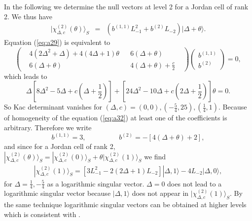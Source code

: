 \documentclass[a4paper,11pt]{article}
\begin{document}
In the following we determine the null vectors at level 2 for a
Jordan cell of rank 2. We thus have
\begin{eqnarray}\label{eq:a31}
|\chi_{\Delta,c}^{(2)}(\theta)\rangle_{S}&=&\left(b^{(1,1)}L_{-1}^{2}+b^{(2)}L_{-2}\right)|\Delta+\theta\rangle.
\end{eqnarray}
Equation (\ref{eq:a29}) is equivalent to
\begin{equation}\label{eq:a32}
\left(\begin{array}{ccccc}
       &4(2\Delta^{2}+\Delta)+4(4\Delta+1)\theta&&6(\Delta+\theta)&\\
       &6(\Delta+\theta)&&4(\Delta+\theta)+\frac{c}{2}&
\end{array}\right)\left(\begin{array}{c}
b^{(1,1)}\\b^{(2)}\end{array}\right)=0,
\end{equation}
which leads to
\begin{equation}\label{eq:a33}
\Delta\left[8\Delta^{2}-5\Delta+c(\Delta+\frac{1}{2})\right]+\left[24\Delta^{2}-10\Delta+c(2\Delta+\frac{1}{2})\right]\theta=0.
\end{equation}
So Kac determinant vanishes for
$(\Delta,c)=(0,0),(-\frac{5}{4},25),(\frac{1}{4},1)$. Because of
homogeneity of the equation (\ref{eq:a32}) at least one of the
coefficients is arbitrary. Therefore we write
\begin{equation}\label{eq:a34}
b^{(1,1)}=3, \hspace{2cm} b^{(2)}=-[4(\Delta+\theta)+2],
\end{equation}
and since for a Jordan cell of rank 2,
$|\chi_{\Delta,c}^{(2)}(\theta)\rangle_{S}=|\chi_{\Delta,c}^{(2)}(0)\rangle_{S}+\theta|\chi_{\Delta,c}^{(2)}(1)\rangle_{S}$
we find
\begin{eqnarray}\label{eq:a35}
|\chi_{\Delta,c}^{(2)}(1)\rangle_{S}=
\left[3L_{-1}^{2}-2(2\Delta+1)L_{-2}\right]|\Delta,1\rangle-4L_{-2}|\Delta,0\rangle,
\end{eqnarray}
for $\Delta=\frac{1}{4},-\frac{5}{4}$ as a logarithmic singular
vector. $\Delta=0$ does not lead to a logarithmic singular vector
because $|\Delta,1\rangle$ does not appear in
$|\chi_{\Delta,c}^{(2)}(1)\rangle_{S}$. By the same technique
logarithmic singular vectors can be obtained at higher levels
which is consistent with \cite{floh3}.
\end{document}
